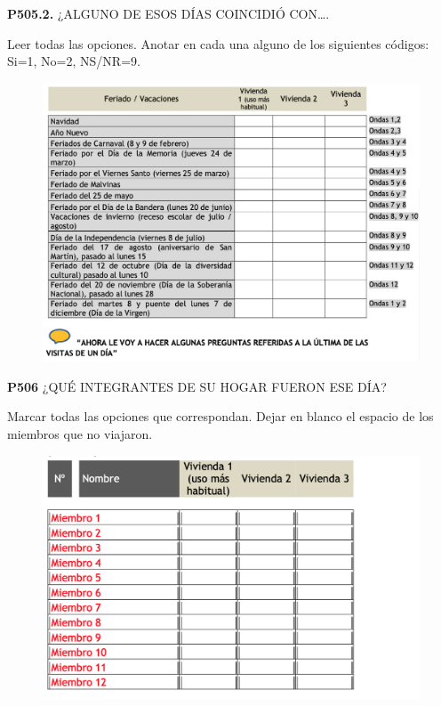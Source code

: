 \documentclass[
  openany]{book}
\begin{document}
\textbf{P505.2.} ¿ALGUNO DE ESOS DÍAS COINCIDIÓ CON\ldots.

Leer todas las opciones. Anotar en cada una alguno de los siguientes códigos: Si=1, No=2, NS/NR=9.

\begin{figure}

{\centering \includegraphics[width=1\linewidth]{imagenes/figura6-194} 

}

\end{figure}

\textbf{P506} ¿QUÉ INTEGRANTES DE SU HOGAR FUERON ESE DÍA?

Marcar todas las opciones que correspondan. Dejar en blanco el espacio de los miembros que no viajaron.

\begin{figure}

{\centering \includegraphics[width=1\linewidth]{imagenes/figura6-195} 

}

\end{figure}
\end{document}
